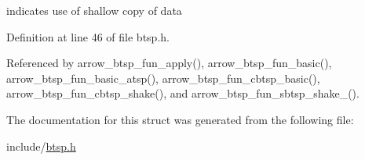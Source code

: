 indicates use of shallow copy of data 

Definition at line 46 of file btsp.h.

Referenced by arrow\_\-btsp\_\-fun\_\-apply(), arrow\_\-btsp\_\-fun\_\-basic(), arrow\_\-btsp\_\-fun\_\-basic\_\-atsp(), arrow\_\-btsp\_\-fun\_\-cbtsp\_\-basic(), arrow\_\-btsp\_\-fun\_\-cbtsp\_\-shake(), and arrow\_\-btsp\_\-fun\_\-sbtsp\_\-shake\_().

The documentation for this struct was generated from the following file:\begin{CompactItemize}
\item 
include/\hyperlink{btsp_8h}{btsp.h}\end{CompactItemize}
